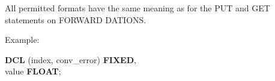 




All permitted formats have the same meaning as for the PUT and GET
statements 
on FORWARD DATIONS.

Example:

\begin{tabbing}
{\bf DCL} (index, conv\_error) \= {\bf FIXED},\\
\x        value                \> {\bf FLOAT};\\
\end{tabbing}

